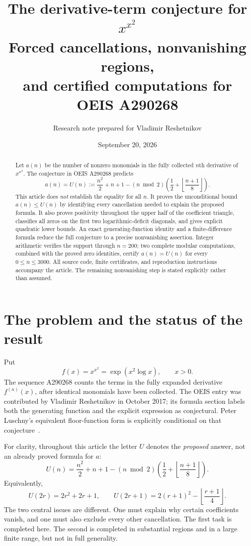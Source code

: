 \documentclass[11pt]{article}
\title{The derivative-term conjecture for \texorpdfstring{$x^{x^2}$}{x raised to x squared}\\[4pt]
\large Forced cancellations, nonvanishing regions,\\and certified computations for OEIS A290268}
\author{Research note prepared for Vladimir Reshetnikov}
\date{September 20, 2026}
\numberwithin{equation}{section}
\theoremstyle{definition}
\theoremstyle{remark}
\newcommand{\U}{U}
\begin{document}
\maketitle
\begin{abstract}
Let $a(n)$ be the number of nonzero monomials in the fully collected $n$th
 derivative of $x^{x^2}$. The conjecture in OEIS A290268 predicts
\[
 a(n)=\U(n):=\frac{n^2}{2}+n+1
 -(n\bmod2)\left(\frac12+\left\lfloor\frac{n+1}{8}\right\rfloor\right).
\]
This article does \emph{not} establish the equality for all $n$. It proves the
unconditional bound $a(n)\le\U(n)$ by identifying every cancellation needed to
explain the proposed formula. It also proves positivity throughout the upper
half of the coefficient triangle, classifies all zeros on the first two
logarithmic-deficit diagonals, and gives explicit quadratic lower bounds.
An exact generating-function identity and a finite-difference formula reduce
the full conjecture to a precise nonvanishing assertion. Integer arithmetic
verifies the support through $n=200$; two complete modular computations,
combined with the proved zero identities, certify $a(n)=\U(n)$ for every
$0\le n\le3000$. All source code, finite certificates, and reproduction
instructions accompany the article. The remaining nonvanishing step is
stated explicitly rather than assumed.
\end{abstract}

\section{The problem and the status of the result}\label{sec:introduction}
Put
\[
 f(x)=x^{x^2}=\exp(x^2\log x),\qquad x>0.
\]
The sequence A290268 counts the terms in the fully expanded derivative
$f^{(n)}(x)$, after identical monomials have been collected. The OEIS entry
was contributed by Vladimir Reshetnikov in October 2017; its formula section
labels both the generating function and the explicit expression as
conjectural. Peter Luschny's equivalent floor-function form is explicitly
conditional on that conjecture~\cite{oeis}.

For clarity, throughout this article the letter $\U$ denotes the
\emph{proposed} answer, not an already proved formula for $a$:
\begin{equation}\label{eq:U}
 \U(n)=\frac{n^2}{2}+n+1
 -(n\bmod2)\left(\frac12+\left\lfloor\frac{n+1}{8}\right\rfloor\right).
\end{equation}
Equivalently,
\begin{equation}\label{eq:U-parity}
 \U(2r)=2r^2+2r+1,\qquad
 \U(2r+1)=2(r+1)^2-\left\lfloor\frac{r+1}{4}\right\rfloor.
\end{equation}
The two central issues are different. One must explain why certain
coefficients vanish, and one must also exclude every other cancellation.
The first task is completed here. The second is completed in substantial
regions and in a large finite range, but not in full generality.
\end{document}
